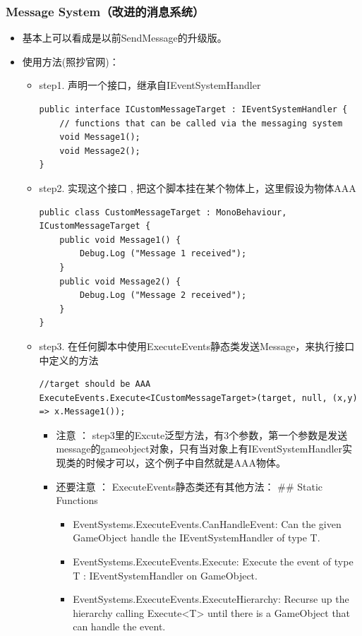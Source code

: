 \documentclass[9pt, b5paper]{article}
\begin{document}
\subsubsection{Message System（改进的消息系统）}
\label{sec:org68b85f8}
\begin{itemize}
\item 基本上可以看成是以前SendMessage的升级版。
\item 使用方法(照抄官网)：
\begin{itemize}
\item step1. 声明一个接口，继承自IEventSystemHandler
\begin{verbatim}
public interface ICustomMessageTarget : IEventSystemHandler {
    // functions that can be called via the messaging system
    void Message1();
    void Message2();
}
\end{verbatim}
\item step2. 实现这个接口 , 把这个脚本挂在某个物体上，这里假设为物体AAA
\begin{verbatim}
public class CustomMessageTarget : MonoBehaviour, ICustomMessageTarget {
    public void Message1() {
        Debug.Log ("Message 1 received");
    }
    public void Message2() {
        Debug.Log ("Message 2 received");
    }
}
\end{verbatim}
\item step3. 在任何脚本中使用ExecuteEvents静态类发送Message，来执行接口中定义的方法
\begin{verbatim}
//target should be AAA
ExecuteEvents.Execute<ICustomMessageTarget>(target, null, (x,y) => x.Message1());
\end{verbatim}
\begin{itemize}
\item 注意 ： step3里的Excute泛型方法，有3个参数，第一个参数是发送message的gameobject对象，只有当对象上有IEventSystemHandler实现类的时候才可以，这个例子中自然就是AAA物体。
\item 还要注意 ： ExecuteEvents静态类还有其他方法： \#\# Static Functions
\begin{itemize}
\item EventSystems.ExecuteEvents.CanHandleEvent: Can the given GameObject handle the IEventSystemHandler of type T.
\item EventSystems.ExecuteEvents.Execute: Execute the event of type T : IEventSystemHandler on GameObject.
\item EventSystems.ExecuteEvents.ExecuteHierarchy: Recurse up the hierarchy calling Execute<T> until there is a GameObject that can handle the event.

\end{itemize}
\end{itemize}
\end{itemize}
\end{itemize}
\end{document}

